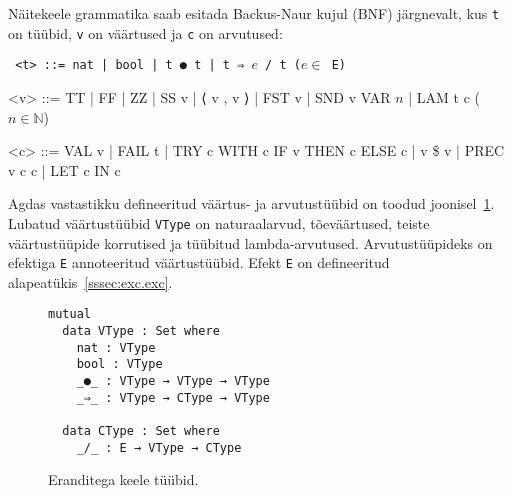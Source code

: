 \documentclass[a4paper,12pt]{article}
\begin{document}
Näitekeele grammatika saab esitada Backus-Naur kujul (BNF) järgnevalt, kus {\tt t} on tüübid, {\tt v} on väärtused ja {\tt c} on arvutused:
\begin{adjustwidth}{1em}{0pt}
\begin{grammar}\tt
<t> ::= nat | bool | t ● t | t ⇒ $e$ / t \hfill ($e \in$ E)
  
<v> ::= TT | FF | ZZ | SS v | ⟨ v , v ⟩ | FST v | SND v
    \alt VAR $n$ | LAM t c \hfill ($n \in \mathbb N$)
  
<c> ::= VAL v | FAIL t | TRY c WITH c
    \alt IF v THEN c ELSE c | v \$ v | PREC v c c | LET c IN c
\end{grammar}
\end{adjustwidth}
Agdas vastastikku defineeritud väärtus- ja arvutustüübid on toodud joonisel~\ref{fig:exc.types}.
Lubatud väärtustüübid {\tt VType} on naturaalarvud, tõeväärtused, teiste väärtustüüpide korrutised ja tüübitud lambda-arvutused.
Arvutustüüpideks on efektiga {\tt E} annoteeritud väärtustüübid. Efekt {\tt E} on defineeritud alapeatükis~\ref{sssec:exc.exc}.
\begin{figure}
  \begin{BVerbatim}
mutual
  data VType : Set where
    nat : VType
    bool : VType
    _●_ : VType → VType → VType
    _⇒_ : VType → CType → VType

  data CType : Set where
    _/_ : E → VType → CType
  \end{BVerbatim}
  \caption{Eranditega keele tüübid.}
  \label{fig:exc.types}
\end{figure}
\end{document}
